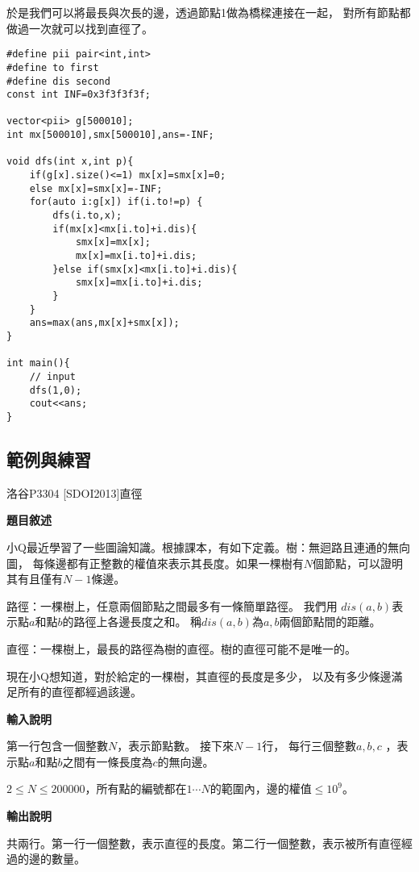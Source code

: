     於是我們可以將最長與次長的邊，透過節點1做為橋樑連接在一起，
    對所有節點都做過一次就可以找到直徑了。

\begin{lstlisting}[caption=樹直徑DP算法]
#define pii pair<int,int>
#define to first
#define dis second
const int INF=0x3f3f3f3f;

vector<pii> g[500010];
int mx[500010],smx[500010],ans=-INF;

void dfs(int x,int p){
    if(g[x].size()<=1) mx[x]=smx[x]=0;
    else mx[x]=smx[x]=-INF;
    for(auto i:g[x]) if(i.to!=p) {
        dfs(i.to,x);
        if(mx[x]<mx[i.to]+i.dis){
            smx[x]=mx[x];
            mx[x]=mx[i.to]+i.dis;
        }else if(smx[x]<mx[i.to]+i.dis){
            smx[x]=mx[i.to]+i.dis;
        }
    }
    ans=max(ans,mx[x]+smx[x]);
}

int main(){
    // input
    dfs(1,0);
    cout<<ans;
}
\end{lstlisting}

    \subsection{範例與練習}

    \problem 洛谷P3304 [SDOI2013]直徑

    \textbf{題目敘述}

    小Q最近學習了一些圖論知識。根據課本，有如下定義。樹：無迴路且連通的無向圖，
    每條邊都有正整數的權值來表示其長度。如果一棵樹有$N$個節點，可以證明其有且僅有$N-1$條邊。

    路徑：一棵樹上，任意兩個節點之間最多有一條簡單路徑。
    我們用 $dis(a,b)$表示點$a$和點$b$的路徑上各邊長度之和。
    稱$dis(a,b)$為$a,b$兩個節點間的距離。

    直徑：一棵樹上，最長的路徑為樹的直徑。樹的直徑可能不是唯一的。

    現在小Q想知道，對於給定的一棵樹，其直徑的長度是多少，
    以及有多少條邊滿足所有的直徑都經過該邊。

    \textbf{輸入說明}

    第一行包含一個整數$N$，表示節點數。 接下來$N-1$行，
    每行三個整數$a, b, c$ ，表示點$a$和點$b$之間有一條長度為$c$的無向邊。

    $2 \le N \le 200000$，所有點的編號都在$1 \cdots N$的範圍內，邊的權值$\le 10^9$。
    
    \textbf{輸出說明}

    共兩行。第一行一個整數，表示直徑的長度。第二行一個整數，表示被所有直徑經過的邊的數量。

